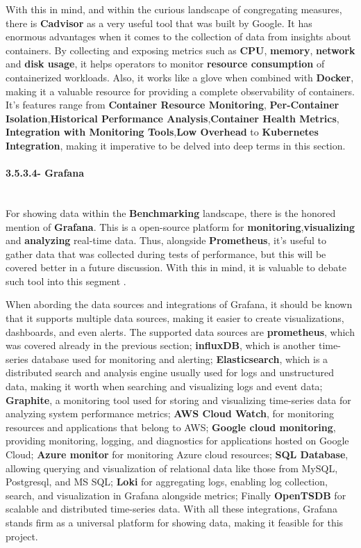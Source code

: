 With this in mind, and within the curious landscape of congregating measures, there is \textbf{Cadvisor} as a very useful tool that was 
built by Google. It has enormous advantages when it comes to the collection of data from insights about containers. By collecting and 
exposing metrics such as \textbf{CPU}, \textbf{memory}, \textbf{network} and \textbf{disk usage}, it helps operators to monitor 
\textbf{resource consumption} of containerized workloads. Also, it works like a glove when combined with \textbf{Docker}, making it a 
valuable resource for providing a complete observability of containers. It's features range from \textbf{Container Resource Monitoring},
\textbf{Per-Container Isolation},\textbf{Historical Performance Analysis},\textbf{Container Health Metrics},
\textbf{Integration with Monitoring Tools},\textbf{Low Overhead} to \textbf{Kubernetes Integration}, making it imperative to be delved into 
deep terms in this section.


\paragraph{3.5.3.4- Grafana}\mbox{}\\
For showing data within the \textbf{Benchmarking} landscape, there is the honored mention of \textbf{Grafana}. This is a open-source 
platform for \textbf{monitoring},\textbf{visualizing} and \textbf{analyzing} real-time data. Thus, alongside \textbf{Prometheus}, 
it's useful to gather data that was collected during tests of performance, but this will be covered better in a future discussion. With 
this in mind, it is valuable to debate such tool into this segment \cite{grafana}.

When abording the data sources and integrations of Grafana, it should be known that it supports multiple data sources, making it easier to 
create visualizations, dashboards, and even alerts. The supported data sources are \textbf{prometheus}, which was covered already in 
the previous section; \textbf{influxDB}, which is another time-series database used for monitoring and alerting; \textbf{Elasticsearch}, 
which is a distributed search and analysis engine usually used for logs and unstructured data, making it worth when searching and 
visualizing logs and event data; \textbf{Graphite}, a monitoring tool used for storing and visualizing time-series data for analyzing 
system performance metrics; \textbf{AWS Cloud Watch}, for monitoring resources and applications that belong to AWS; 
\textbf{Google cloud monitoring}, providing monitoring, logging, and diagnostics for applications hosted on Google Cloud; 
\textbf{Azure monitor} for monitoring Azure cloud resources; \textbf{SQL Database}, allowing querying and visualization of relational 
data like those from MySQL, Postgresql, and MS SQL; \textbf{Loki} for aggregating logs, enabling log collection, search, 
and visualization in Grafana alongside metrics; Finally \textbf{OpenTSDB} for scalable and distributed time-series data. With all 
these integrations, Grafana stands firm as a universal platform for showing data, making it feasible for this project.

